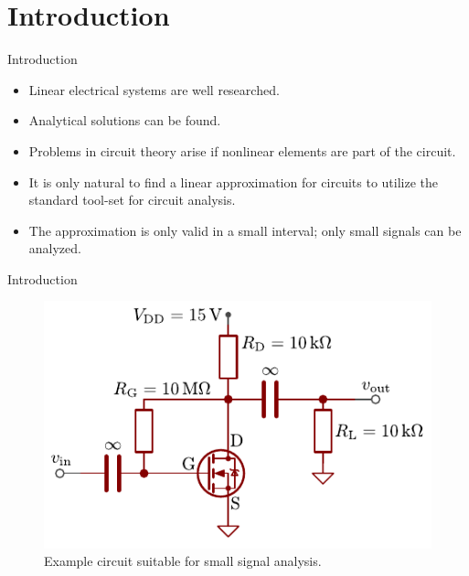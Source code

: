 \section{Introduction}
\begin{frame}{Introduction}
	\begin{itemize}
		\item Linear electrical systems are well researched.
		\item Analytical solutions can be found.
		\item Problems in circuit theory arise if nonlinear elements are part of the circuit.
		\item It is only natural to find a linear approximation for circuits to utilize the standard
		tool-set for circuit analysis.
		\item The approximation is only valid in a small interval; only small signals can be 
		analyzed.
	\end{itemize}
\end{frame}
\begin{frame}{Introduction}
	\begin{figure}
		\centering
		\includegraphics{../assets/example_circuit.pdf}
		\caption{Example circuit suitable for small signal analysis.}
		\label{fig:example_circuit}
	\end{figure}
\end{frame}